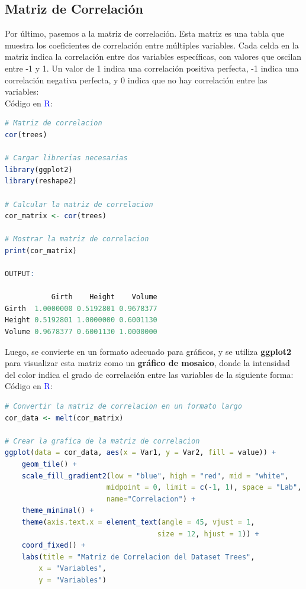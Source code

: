 \documentclass{article}
\begin{document}
\subsection{Matriz de Correlación}
Por último, pasemos a la matriz de correlación. Esta matriz es una tabla que muestra los coeficientes de correlación entre múltiples variables. Cada celda en la matriz indica la correlación entre dos variables específicas, con valores que oscilan entre -1 y 1. Un valor de 1 indica una correlación positiva perfecta, -1 indica una correlación negativa perfecta, y 0 indica que no hay correlación entre las variables:\\
Código en \textcolor{blue}{R}:
\begin{lstlisting}[language=R, caption=Matriz de Correlación]
# Matriz de correlacion
cor(trees)

# Cargar librerias necesarias
library(ggplot2)
library(reshape2)

# Calcular la matriz de correlacion
cor_matrix <- cor(trees)

# Mostrar la matriz de correlacion
print(cor_matrix)

OUTPUT:

           Girth    Height    Volume
Girth  1.0000000 0.5192801 0.9678377
Height 0.5192801 1.0000000 0.6001130
Volume 0.9678377 0.6001130 1.0000000
\end{lstlisting}
Luego, se convierte en un formato adecuado para gráficos, y se utiliza \textbf{ggplot2} para visualizar esta matriz como un \textbf{gráfico de mosaico}, donde la intensidad del color indica el grado de correlación entre las variables de la siguiente forma:
\newpage
Código en \textcolor{blue}{R}:
\begin{lstlisting}[language=R, caption=Gráfica de Mosaico para la Matriz de Correlación]
# Convertir la matriz de correlacion en un formato largo
cor_data <- melt(cor_matrix)
    
# Crear la grafica de la matriz de correlacion
ggplot(data = cor_data, aes(x = Var1, y = Var2, fill = value)) +
    geom_tile() +
    scale_fill_gradient2(low = "blue", high = "red", mid = "white", 
                        midpoint = 0, limit = c(-1, 1), space = "Lab", 
                        name="Correlacion") +
    theme_minimal() +
    theme(axis.text.x = element_text(angle = 45, vjust = 1, 
                                    size = 12, hjust = 1)) +
    coord_fixed() +
    labs(title = "Matriz de Correlacion del Dataset Trees",
        x = "Variables",
        y = "Variables")
\end{lstlisting}
\end{document}
